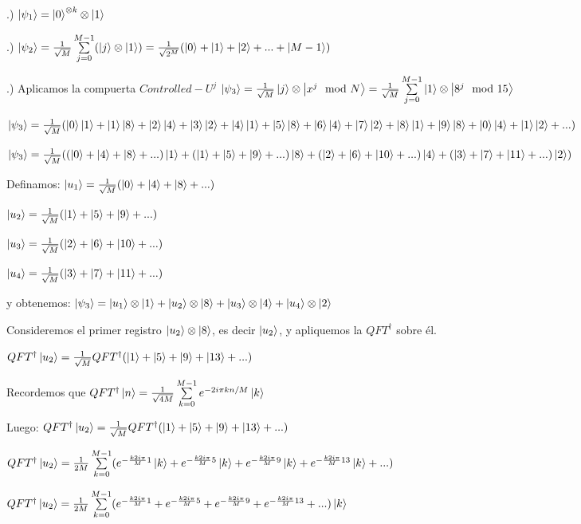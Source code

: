 .) $\ket{\psi_1} = \ket{0}^{\otimes k} \otimes \ket{1}$

.) $\ket{\psi_2} = \frac{1}{\sqrt{M}} \sum\limits_{j=0}^{M-1} (\ket{j} \otimes \ket{1}) = \frac{1}{\sqrt{2^M}} (\ket{0} + \ket{1} + \ket{2} + ... + \ket{M-1})$

.) Aplicamos la compuerta $Controlled-U^j$ $\ket{\psi_3} = \frac{1}{\sqrt{M}} \ket{j} \otimes \ket{x^j \mod N} = \frac{1}{\sqrt{M}} \sum\limits_{j=0}^{M-1} \ket{1} \otimes \ket{8^j \mod 15}$

$\ket{\psi_3} = \frac{1}{\sqrt{M}} (\ket{0}\ket{1} + \ket{1}\ket{8} + \ket{2}\ket{4} + \ket{3}\ket{2} + \ket{4}\ket{1} + \ket{5}\ket{8} + \ket{6}\ket{4} + \ket{7}\ket{2} + \ket{8}\ket{1} + \ket{9}\ket{8} + \ket{0}\ket{4} + \ket{1}\ket{2} + ...)$

$\ket{\psi_3} = \frac{1}{\sqrt{M}} ((\ket{0} + \ket{4} + \ket{8} + ...)\ket{1} + (\ket{1} + \ket{5} + \ket{9} + ...) \ket{8} + (\ket{2} + \ket{6} + \ket{10} + ...) \ket{4} + (\ket{3} + \ket{7} + \ket{11} + ...) \ket{2})$

Definamos: $\ket{u_1} = \frac{1}{\sqrt{M}} (\ket{0} + \ket{4} + \ket{8} + ...)$

$\ket{u_2} = \frac{1}{\sqrt{M}} (\ket{1} + \ket{5} + \ket{9} + ...)$

$\ket{u_3} = \frac{1}{\sqrt{M}} (\ket{2} + \ket{6} + \ket{10} + ...)$

$\ket{u_4} = \frac{1}{\sqrt{M}} (\ket{3} + \ket{7} + \ket{11} + ...)$

y obtenemos: $\ket{\psi_3} = \ket{u_1} \otimes \ket{1} + \ket{u_2} \otimes \ket{8} + \ket{u_3} \otimes \ket{4} + \ket{u_4} \otimes \ket{2}$

Consideremos el primer registro $\ket{u_2} \otimes \ket{8}$, es decir $\ket{u_2}$, y apliquemos la $QFT^\dagger$ sobre él.

$QFT^\dagger \ket{u_2} = \frac{1}{\sqrt{M}} QFT^\dagger (\ket{1} + \ket{5} + \ket{9} + \ket{13} + ...)$

Recordemos que $QFT^\dagger \ket{n} = \frac{1}{\sqrt{4 M}} \sum\limits_{k=0}^{M-1} e^{-2 i \pi k n /M} \ket{k}$

Luego: $QFT^\dagger \ket{u_2} = \frac{1}{\sqrt{M}} QFT^\dagger (\ket{1} + \ket{5} + \ket{9} + \ket{13} + ...)$

$QFT^\dagger \ket{u_2} = \frac{1}{2M} \sum\limits_{k=0}^{M-1} (e^{- \frac{k 2 i \pi}{M} 1} \ket{k} + e^{- \frac{k 2 i \pi}{M} 5} \ket{k} + e^{- \frac{k 2 i \pi}{M} 9} \ket{k} + e^{- \frac{k 2 i \pi}{M} 13} \ket{k} + ...)$


$QFT^\dagger \ket{u_2} = \frac{1}{2M} \sum\limits_{k=0}^{M-1} (e^{- \frac{k 2 i \pi}{M} 1} + e^{- \frac{k 2 i \pi}{M} 5} + e^{- \frac{k 2 i \pi}{M} 9} + e^{- \frac{k 2 i \pi}{M} 13} + ...) \ket{k}$

